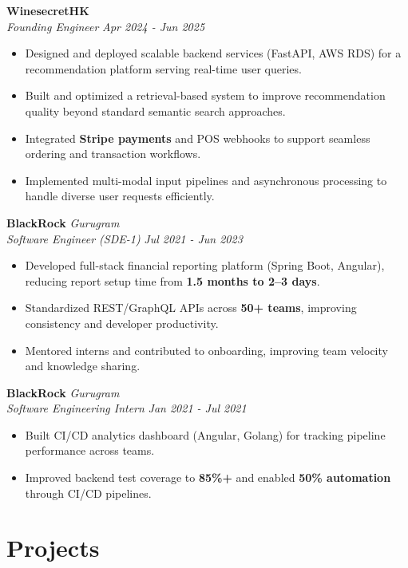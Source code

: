 \documentclass[10pt,a4paper]{article}
\newcommand{\resumeItem}[1]{\item\small{#1}}
\begin{document}
\vspace{4pt}

\textbf{WinesecretHK} \hfill \textit{} \\
\textit{Founding Engineer} \hfill \textit{Apr 2024 - Jun 2025}
\begin{itemize}[leftmargin=*,noitemsep]
    \resumeItem{Designed and deployed scalable backend services (FastAPI, AWS RDS) for a recommendation platform serving real-time user queries.}
    \resumeItem{Built and optimized a retrieval-based system to improve recommendation quality beyond standard semantic search approaches.}
    \resumeItem{Integrated \textbf{Stripe payments} and POS webhooks to support seamless ordering and transaction workflows.}
    \resumeItem{Implemented multi-modal input pipelines and asynchronous processing to handle diverse user requests efficiently.}
\end{itemize}

\vspace{4pt}

\textbf{BlackRock} \hfill \textit{Gurugram} \\
\textit{Software Engineer (SDE-1)} \hfill \textit{Jul 2021 - Jun 2023}
\begin{itemize}[leftmargin=*,noitemsep]
    \resumeItem{Developed full-stack financial reporting platform (Spring Boot, Angular), reducing report setup time from \textbf{1.5 months to 2--3 days}.}
    \resumeItem{Standardized REST/GraphQL APIs across \textbf{50+ teams}, improving consistency and developer productivity.}
    \resumeItem{Mentored interns and contributed to onboarding, improving team velocity and knowledge sharing.}
\end{itemize}

\vspace{4pt}

\textbf{BlackRock} \hfill \textit{Gurugram} \\
\textit{Software Engineering Intern} \hfill \textit{Jan 2021 - Jul 2021}
\begin{itemize}[leftmargin=*,noitemsep]
    \resumeItem{Built CI/CD analytics dashboard (Angular, Golang) for tracking pipeline performance across teams.}
    \resumeItem{Improved backend test coverage to \textbf{85\%+} and enabled \textbf{50\% automation} through CI/CD pipelines.}
\end{itemize}

\vspace{4pt}

\section{Projects}
\end{document}
